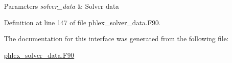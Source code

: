 \begin{DoxyParams}{Parameters}
{\em solver\+\_\+data} & Solver data \\
\hline
\end{DoxyParams}


Definition at line 147 of file phlex\+\_\+solver\+\_\+data.\+F90.



The documentation for this interface was generated from the following file\+:\begin{DoxyCompactItemize}
\item 
\mbox{\hyperlink{phlex__solver__data_8_f90}{phlex\+\_\+solver\+\_\+data.\+F90}}\end{DoxyCompactItemize}

